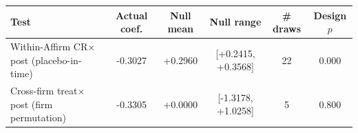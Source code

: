 \begin{tabular}{lccccc}
\toprule
Test & Actual coef. & Null mean & Null range & \# draws & Design $p$ \\
\midrule
Within-Affirm CR$\times$post (placebo-in-time) & -0.3027 & +0.2960 & [+0.2415, +0.3568] & 22 & 0.000 \\
Cross-firm treat$\times$post (firm permutation) & -0.3305 & +0.0000 & [-1.3178, +1.0258] & 5 & 0.800 \\
\bottomrule
\end{tabular}